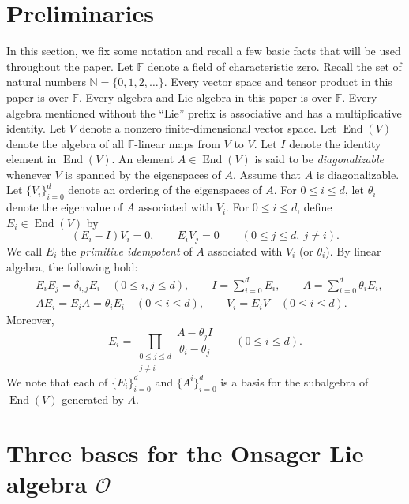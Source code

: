 \documentclass[11pt]{article}%
\theoremstyle{definition}
\theoremstyle{plain}
\begin{document}
\section{Preliminaries}\label{Sec:prelim}
In this section, we fix some notation and recall a few basic facts that will be used throughout the paper.
Let $\mathbb{F}$ denote a field of characteristic zero.
Recall the set of natural numbers $\mathbb{N} = \{0,1,2,\ldots \}$.
Every vector space and tensor product in this paper is over $\mathbb{F}$. 
Every algebra and Lie algebra in this paper is over $\mathbb{F}$. 
Every algebra mentioned without the ``Lie'' prefix is associative and has a multiplicative identity.
Let $V$ denote a nonzero finite-dimensional vector space.
Let $\operatorname{End}(V)$ denote the algebra of all $\mathbb{F}$-linear maps from $V$ to $V$. 
Let $I$ denote the identity element in $\operatorname{End}(V)$.
An element $A \in \operatorname{End}(V)$ is said to be \emph{diagonalizable} whenever $V$ is spanned by the eigenspaces of $A$. 
Assume that $A$ is diagonalizable. 
Let $\{V_i\}_{i=0}^d$ denote an ordering of the eigenspaces of $A$.
For $0 \leq i \leq d$, let $\theta_i$ denote the eigenvalue of $A$ associated with $V_i$. 
For $0 \leq i \leq d$, define $E_i \in \operatorname{End}(V)$ by
$$
	(E_i - I )V_i = 0, \qquad 
	E_iV_j  = 0 \qquad(0 \leq j \leq d, \ j \neq i).
$$
We call $E_i$ the \emph{primitive idempotent} of $A$ associated with $V_i$ (or $\theta_i$).
By linear algebra, the following hold:
\begin{align*}
	& E_iE_j  = \delta_{i,j}E_i \quad (0 \leq i, j \leq d), \qquad
	I  = \sum_{i=0}^d E_i, \qquad
	A  = \sum^d_{i=0}\theta_iE_i, \\ 
	& AE_i  = E_iA = \theta_iE_i \quad (0 \leq i \leq d), \qquad
	V_i  = E_iV \quad (0 \leq i \leq d).
\end{align*}
Moreover,
\begin{equation*}
	E_i = \prod_{\substack{0 \leq j \leq d \\ j \neq i}} \frac{A - \theta_j I}{\theta_i - \theta_j} \qquad (0 \leq i \leq d).
\end{equation*} 
We note that each of $\{E_i\}_{i=0}^d$ and $\{A^i\}_{i=0}^d$ is a basis for the subalgebra of $\operatorname{End}(V)$ generated by $A$. 


\section{Three bases for the Onsager Lie algebra $\mathcal{O}$}\label{Sec:three-bases}
\end{document}

